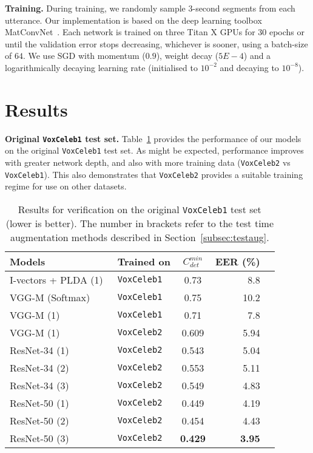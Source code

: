 \documentclass[a4paper]{article}
\def\newpara{\vspace{2pt}}
\def\aftertab{\vspace{-22pt}}
\begin{document}
\newpara\noindent\textbf{Training.}
During training, we randomly sample 3-second segments from each utterance.
Our implementation is based on the deep learning toolbox MatConvNet~\cite{Vedaldi14a}.
Each network is trained on three Titan X GPUs for $30$ epochs or until the validation error stops decreasing, whichever is sooner, using a batch-size of $64$. We use SGD with momentum ($0.9$), weight decay ($5E-4$) and a logarithmically decaying learning rate (initialised to $10^{-2}$ and decaying to $10^{-8}$). 



\section{Results}
\label{sec:results}
\newpara\noindent\textbf{Original \texttt{VoxCeleb1}  test set.}
Table~\ref{table:results} provides the performance of our models on
the original \texttt{VoxCeleb1} test set. As might be expected, performance improves with greater network depth, and
also with more training data (\texttt{VoxCeleb2} vs \texttt{VoxCeleb1}). This also demonstrates that 
\texttt{VoxCeleb2} provides a suitable training regime for use on other datasets.


\begin{table}[h!]
\centering
\footnotesize
\begin{tabular}{ l  l c r  r  }

\textbf{Models}             					& \textbf{Trained on} & $C^{min}_{det}$ & EER (\%) \\ \hline  
 I-vectors + PLDA (1)~\cite{Nagrani17}				& \texttt{VoxCeleb1}      & 0.73     & 8.8    \\
 VGG-M (Softmax)~\cite{Nagrani17}		& \texttt{VoxCeleb1} & 0.75    & 10.2 \\ 
 VGG-M 	(1)		~\cite{Nagrani17}		& \texttt{VoxCeleb1} & 0.71    & 7.8 \\ 
 VGG-M 	(1)									  	& \texttt{VoxCeleb2} & 0.609 & 5.94 \\  \hline  
 
 ResNet-34 	(1)							& \texttt{VoxCeleb2} &  0.543 & 5.04 \\
 ResNet-34 	(2)							& \texttt{VoxCeleb2} &  0.553 & 5.11 \\
 ResNet-34 	(3)							& \texttt{VoxCeleb2} &  0.549 & 4.83 \\ \hline  
 
 ResNet-50 	(1)							& \texttt{VoxCeleb2} & 0.449 & 4.19 \\
 ResNet-50 	(2)							& \texttt{VoxCeleb2} & 0.454 & 4.43 \\
 ResNet-50	(3)							& \texttt{VoxCeleb2} &  \textbf{0.429} & \textbf{3.95}  \\ \hline  

\end{tabular} 
\caption{Results for verification on the original {\tt VoxCeleb1} test set (lower is better). The number in brackets refer to the test time augmentation methods described in Section~\ref{subsec:testaug}.}
\label{table:results}
\normalsize
\aftertab
\end{table}
\end{document}
